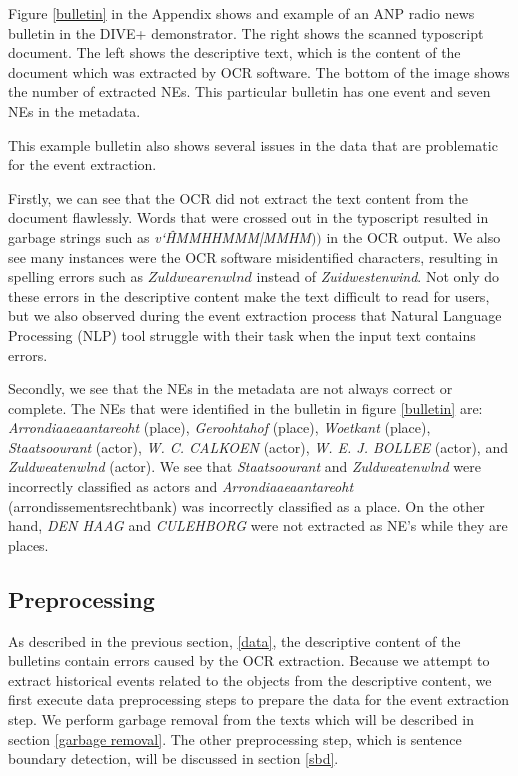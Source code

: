 \documentclass[a4paper, 10pt, conference]{ieeeconf}      %
\begin{document}
Figure \ref{bulletin} in the Appendix shows and example of an ANP radio news bulletin in the DIVE+ demonstrator. The right shows the scanned typoscript document. The left shows the descriptive text, which is the content of the document which was extracted by OCR software. The bottom of the image shows the number of extracted NEs. This particular bulletin has one event and seven NEs in the metadata.

This example bulletin also shows several issues in the data that are problematic for the event extraction. 

Firstly, we can see that the OCR did not extract the text content from the document flawlessly. Words that were crossed out in the typoscript resulted in garbage strings such as \textit{v\char`\^HMMHHMMM|MMHM$))$} in the OCR output. We also see many instances were the OCR software misidentified characters, resulting in spelling errors such as \textit{$Zuldwearenwlnd$} instead of \textit{Zuidwestenwind}. Not only do these errors in the descriptive content make the text difficult to read for users, but we also observed during the event extraction process that Natural Language Processing (NLP) tool struggle with their task when the input text contains errors. 

Secondly, we see that the NEs in the metadata are not always correct or complete. The NEs that were identified in the bulletin in figure \ref{bulletin} are: \textit{Arrondiaaeaantareoht} (place), \textit{Geroohtahof} (place), \textit{Woetkant} (place), \textit{Staatsoourant} (actor), \textit{W. C. CALKOEN} (actor), \textit{W. E. J. BOLLEE} (actor), and \textit{Zuldweatenwlnd} (actor). We see that \textit{Staatsoourant} and \textit{Zuldweatenwlnd} were incorrectly classified as actors and \textit{Arrondiaaeaantareoht} (arrondissementsrechtbank) was incorrectly classified as a place. On the other hand, \textit{DEN HAAG} and \textit{CULEHBORG} were not extracted as NE's while they are places. 


\subsection{Preprocessing}\label{preprocessing}
As described in the previous section, \ref{data}, the descriptive content of the bulletins contain errors caused by the OCR extraction. Because we attempt to extract historical events related to the objects from the descriptive content, we first execute data preprocessing steps to prepare the data for the event extraction step. We  perform garbage removal from the texts which will be described in section \ref{garbage removal}. The other preprocessing step, which is sentence boundary detection, will be discussed in section \ref{sbd}.
\end{document}
